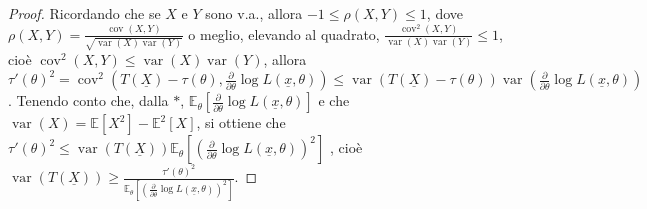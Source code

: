 \documentclass[hidelinks, 10pt]{report}
\DeclareMathOperator{\var}{var}
\DeclareMathOperator{\cov}{cov}
\begin{document}
\begin{proof}
Ricordando che se $ X $ e $ Y $ sono v.a., allora $ -1 \le \rho (X, Y) \le 1 $, dove $ \rho (X, Y) = \frac{\cov(X, Y)}{\sqrt{\var(X)\var(Y)}} $ o meglio, elevando al quadrato, $ \frac{\cov^2(X, Y)}{\var(X)\var(Y)} \le 1 $, cio\`e $ \cov^2(X, Y) \le \var(X) \var(Y) $, allora $ \tau'(\theta)^2 = \cov^2 \left( T(\underline{X}) - \tau(\theta), \frac{\partial}{\partial \theta} \log L(\underline{x}, \theta) \right) \le \var \left( T(\underline{X}) - \tau(\theta) \right) \var \left( \frac{\partial}{\partial \theta} \log L(\underline{x}, \theta) \right) $. Tenendo conto che, dalla $ \ast $, $ \mathbb{E}_{\theta} \left[ \frac{\partial}{\partial \theta} \log L(\underline{x}, \theta) \right] $ e che $ \var(X) = \mathbb{E} [X^2] - \mathbb{E}^2[X] $, si ottiene che $ \tau'(\theta)^2 \le \var(T(\underline{X})) \mathbb{E}_{\theta} \left[ \left( \frac{\partial}{\partial \theta} \log L(\underline{x}, \theta) \right)^2 \right] $ , cio\`e $ \var(T(\underline{X})) \ge \frac{\tau'(\theta)^2}{\mathbb{E}_{\theta} \left[ \left( \frac{\partial}{\partial \theta} \log L(\underline{x}, \theta) \right)^2 \right]} $.
\end{proof}
\end{document}
